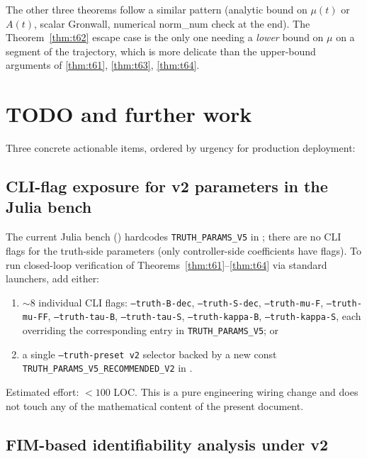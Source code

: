 \documentclass[11pt,a4paper]{article}
\theoremstyle{definition}
\begin{document}
The other three theorems follow a similar pattern (analytic bound on $\mu(t)$ or $A(t)$, scalar Gronwall, numerical norm\_num check at the end). The Theorem~\ref{thm:t62} escape case is the only one needing a \emph{lower} bound on $\mu$ on a segment of the trajectory, which is more delicate than the upper-bound arguments of \ref{thm:t61}, \ref{thm:t63}, \ref{thm:t64}.

\section{TODO and further work} \label{sec:todo}

Three concrete actionable items, ordered by urgency for production deployment:

\subsection{CLI-flag exposure for v2 parameters in the Julia bench}

The current Julia bench () hardcodes \texttt{TRUTH\_PARAMS\_V5} in ; there are no CLI flags for the truth-side parameters (only controller-side coefficients have flags). To run closed-loop verification of Theorems~\ref{thm:t61}--\ref{thm:t64} via standard launchers, add either:
\begin{enumerate}
  \item[(a)] $\sim 8$ individual CLI flags: \texttt{--truth-B-dec}, \texttt{--truth-S-dec}, \texttt{--truth-mu-F}, \texttt{--truth-mu-FF}, \texttt{--truth-tau-B}, \texttt{--truth-tau-S}, \texttt{--truth-kappa-B}, \texttt{--truth-kappa-S}, each overriding the corresponding entry in \texttt{TRUTH\_PARAMS\_V5}; or
  \item[(b)] a single \texttt{--truth-preset v2} selector backed by a new const \texttt{TRUTH\_PARAMS\_V5\_RECOMMENDED\_V2} in .
\end{enumerate}
Estimated effort: $<100$ LOC. This is a pure engineering wiring change and does not touch any of the mathematical content of the present document.

\subsection{FIM-based identifiability analysis under v2} \label{sec:todo-fim}
\end{document}
